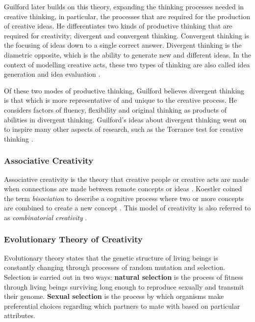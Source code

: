 Guilford later builds on this theory, expanding the thinking processes needed in creative thinking, in particular, the processes that are required for the production of creative ideas.
He differentiates two kinds of productive thinking that are required for creativity; divergent and convergent thinking. 
Convergent thinking is the focusing of ideas down to a single correct answer. 
Divergent thinking is the diametric opposite, which is the ability to generate new and different ideas. 
In the context of modelling creative acts, these two types of thinking are also called idea generation and idea evaluation \citep{guilford1957creative}.

Of these two modes of productive thinking, Guilford believes divergent thinking is that which is more representative of and unique to the creative process. 
He considers factors of fluency, flexibility and original thinking as products of abilities in divergent thinking.
Guilford's ideas about divergent thinking went on to inspire many other aspects of research, such as the Torrance test for creative thinking \citep{torrance1966torrance}.

\subsubsection{Associative Creativity}

Associative creativity is the theory that creative people or creative acts are made when connections are made between remote concepts or ideas \citep{mednick1962associative}. 
Koestler coined the term \textit{bisociation} to describe a cognitive process where two or more concepts are combined to create a new concept \citep{koestler1964act}.
This model of creativity is also referred to as \textit{combinatorial creativity} \citep{boden2004creative}.

\subsubsection{Evolutionary Theory of Creativity}

Evolutionary theory states that the genetic structure of living beings is constantly changing through processes of random mutation and selection. Selection is carried out in two ways: \textbf{natural selection} is the process of fitness through living beings surviving long enough to reproduce sexually and transmit their genome. \textbf{Sexual selection} is the process by which organisms make preferential choices regarding which partners to mate with based on particular attributes.


